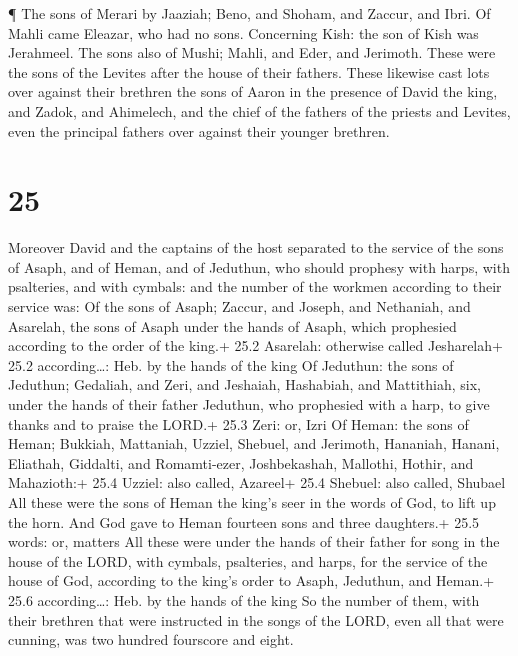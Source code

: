 ¶ The sons of Merari by Jaaziah; Beno, and Shoham, and
Zaccur, and Ibri.  Of Mahli came Eleazar, who had no sons.
 Concerning Kish: the son of Kish was Jerahmeel.
 The sons also of Mushi; Mahli, and Eder, and Jerimoth.
These were the sons of the Levites after the house of their fathers.
 These likewise cast lots over against their brethren the
sons of Aaron in the presence of David the king, and Zadok, and
Ahimelech, and the chief of the fathers of the priests and Levites, even
the principal fathers over against their younger brethren.

\hypertarget{section-24}{%
\section{25}\label{section-24}}

 Moreover David and the captains of the host separated to
the service of the sons of Asaph, and of Heman, and of Jeduthun, who
should prophesy with harps, with psalteries, and with cymbals: and the
number of the workmen according to their service was:  Of
the sons of Asaph; Zaccur, and Joseph, and Nethaniah, and Asarelah, the
sons of Asaph under the hands of Asaph, which prophesied according to
the order of the king.+ 25.2 Asarelah: otherwise called Jesharelah+ 25.2
according\ldots: Heb. by the hands of the king  Of Jeduthun:
the sons of Jeduthun; Gedaliah, and Zeri, and Jeshaiah, Hashabiah, and
Mattithiah, six, under the hands of their father Jeduthun, who
prophesied with a harp, to give thanks and to praise the LORD.+ 25.3
Zeri: or, Izri  Of Heman: the sons of Heman; Bukkiah,
Mattaniah, Uzziel, Shebuel, and Jerimoth, Hananiah, Hanani, Eliathah,
Giddalti, and Romamti-ezer, Joshbekashah, Mallothi, Hothir, and
Mahazioth:+ 25.4 Uzziel: also called, Azareel+ 25.4 Shebuel: also
called, Shubael  All these were the sons of Heman the king's
seer in the words of God, to lift up the horn. And God gave to Heman
fourteen sons and three daughters.+ 25.5 words: or, matters 
All these were under the hands of their father for song in the house of
the LORD, with cymbals, psalteries, and harps, for the service of the
house of God, according to the king's order to Asaph, Jeduthun, and
Heman.+ 25.6 according\ldots: Heb. by the hands of the king 
So the number of them, with their brethren that were instructed in the
songs of the LORD, even all that were cunning, was two hundred fourscore
and eight.


